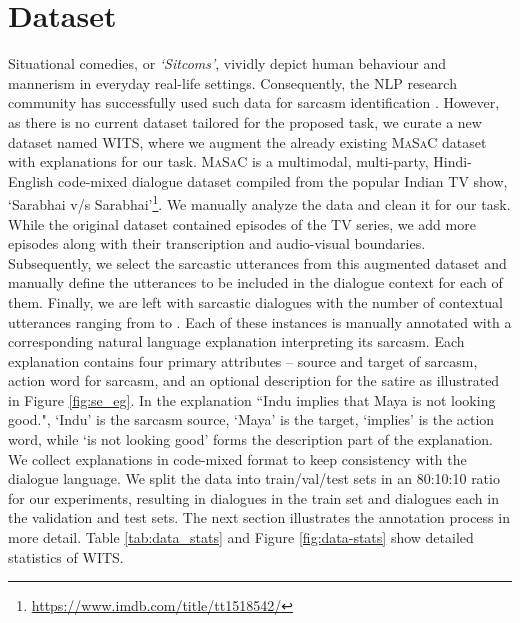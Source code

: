 \documentclass[11pt]{article}
\newcommand{\dataset}{\textsc{WITS}}
\begin{document}
\section{Dataset}
\label{sec:dataset}
Situational comedies, or \textit{`Sitcoms'}, vividly depict human behaviour and mannerism in everyday real-life settings. Consequently, the NLP research community has successfully used such data for sarcasm identification \citep{castro2019multimodal, 9442359}. 
However, as there is no current dataset tailored for the proposed task, we curate a new dataset named \dataset, where we augment the already existing \textsc{MaSaC} dataset \citep{9442359} with explanations for our task. \textsc{MaSaC} is a multimodal, multi-party, Hindi-English code-mixed dialogue dataset compiled from the popular Indian TV show, `Sarabhai v/s Sarabhai'\footnote{\url{https://www.imdb.com/title/tt1518542/}}. 
We manually analyze the data and clean it for our task. 
While the original dataset contained  episodes of the TV series, we add  more episodes along with their transcription and audio-visual boundaries. Subsequently, we select the sarcastic utterances from this augmented dataset and manually define the utterances to be included in the dialogue context for each of them. Finally, we are left with  sarcastic dialogues with the number of contextual utterances ranging from  to . Each of these instances is manually annotated with a corresponding natural language explanation interpreting its sarcasm. Each explanation contains four primary attributes -- source and target of sarcasm, action word for sarcasm, and an optional description for the satire as illustrated in Figure \ref{fig:se_eg}. In the explanation ``Indu implies that Maya is not looking good.", `Indu' is the sarcasm source, `Maya' is the target, `implies' is the action word, while `is not looking good' forms the description part of the explanation. We collect explanations in code-mixed format to keep consistency with the dialogue language. We split the data into train/val/test sets in an 80:10:10 ratio for our experiments, resulting in  dialogues in the train set and  dialogues each in the validation and test sets. 
The next section illustrates the annotation process in more detail.
Table \ref{tab:data_stats} and Figure \ref{fig:data-stats} show detailed statistics of \dataset. 
\end{document}
